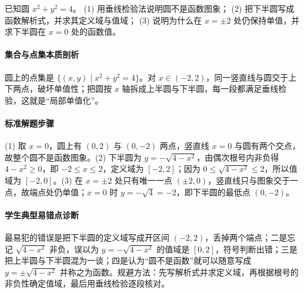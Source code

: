 \begin{problem}
已知圆 $x^2+y^2=4$。
(1) 用垂线检验法说明圆不是函数图象；
(2) 把下半圆写成函数解析式，并求其定义域与值域；
(3) 说明为什么在 $x=\pm2$ 处仍保持单值，并求下半圆在 $x=0$ 处的函数值。
\end{problem}
\begin{solution}
\paragraph{集合与点集本质剖析}
圆上的点集是 $\{(x,y)\mid x^2+y^2=4\}$。对 $x\in(-2,2)$，同一竖直线与圆交于上下两点，破坏单值性；把圆按 $x$ 轴拆成上半圆与下半圆，每一段都满足垂线检验，这就是“局部单值化”。
\paragraph{标准解题步骤}
(1) 取 $x=0$，圆上有 $(0,2)$ 与 $(0,-2)$ 两点，竖直线 $x=0$ 与圆有两个交点，故整个圆不是函数图象。(2) 下半圆为 $y=-\sqrt{4-x^2}$，由偶次根号内非负得 $4-x^2\geq0$，即 $-2\leq x\leq2$，定义域为 $[-2,2]$；因为 $0\leq\sqrt{4-x^2}\leq2$，所以值域为 $[-2,0]$。(3) 在 $x=\pm2$ 处只有唯一一点 $(\pm2,0)$，竖直线只与图象交于一点，故端点处仍单值；$x=0$ 时 $y=-\sqrt{4}=-2$，即下半圆的最低点 $(0,-2)$。
\paragraph{学生典型易错点诊断}
最易犯的错误是把下半圆的定义域写成开区间 $(-2,2)$，丢掉两个端点；二是忘记 $\sqrt{4-x^2}$ 非负，误以为 $y=-\sqrt{4-x^2}$ 的值域是 $[0,2]$，符号判断出错；三是把上半圆与下半圆混为一谈；四是认为“圆不是函数”就可以随意写成 $y=\pm\sqrt{4-x^2}$ 并称之为函数。规避方法：先写解析式并求定义域，再根据根号的非负性确定值域，最后用垂线检验逐段核对。
\end{solution}
